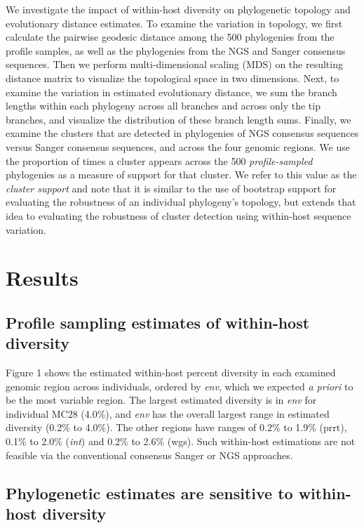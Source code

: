 \documentclass[letterpaper]{article}
\begin{document}
We investigate the impact of within-host diversity on phylogenetic topology and evolutionary distance estimates. To examine the variation in topology, we first calculate the pairwise geodesic distance \parencite{billera,owen} among the 500 phylogenies from the profile samples, as well as the phylogenies from the NGS and Sanger consensus sequences. Then we perform multi-dimensional scaling (MDS) on the resulting distance matrix to visualize the topological space in two dimensions. Next, to examine the variation in estimated evolutionary distance, we sum the branch lengths within each phylogeny across all branches and across only the tip branches, and visualize the distribution of these branch length sums. Finally, we examine the clusters that are detected in phylogenies of NGS consensus sequences versus Sanger consensus sequences, and across the four genomic regions. We use the proportion of times a cluster appears across the 500 \emph{profile-sampled} phylogenies as a measure of support for that cluster. We refer to this value as the \emph{cluster support} and note that it is similar to the use of bootstrap support for evaluating the robustness of an individual phylogeny's topology, but extends that idea to evaluating the robustness of cluster detection using within-host sequence variation.

\section*{Results}

\subsection*{Profile sampling estimates of within-host diversity}

Figure 1 shows the estimated within-host percent diversity in each examined genomic region across individuals, ordered by \emph{env}, which we expected \emph{a priori} to be the most variable region. The largest estimated diversity is in \emph{env} for individual MC28 (4.0\%), and \emph{env} has the overall largest range in estimated diversity (0.2\% to 4.0\%). The other regions have ranges of 0.2\% to 1.9\% (prrt), 0.1\% to 2.0\% (\emph{int}) and 0.2\% to 2.6\% (wgs). Such within-host estimations are not feasible via the conventional consensus Sanger or NGS approaches.

\subsection*{Phylogenetic estimates are sensitive to within-host diversity}
\end{document}
